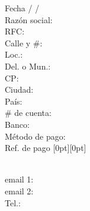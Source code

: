 \documentclass{article}
\newlength{\xorig}   \setlength{\xorig}{0cm}
\newlength{\yorig}   \setlength{\yorig}{0cm}
\begin{document}
\begin{center}
\begin{minipage}{0.4675\textwidth}
	\end{minipage} \hspace{0.5cm}
	\begin{minipage}{0.4675\textwidth}
		Fecha \sout{\hfill\mbox{}} \hspace{1.25cm} / \hspace{1.25cm} / \hspace{1.25cm} \\
		Razón social: \uline{\hfill\mbox{}} \\
		RFC: \uline{\hfill\mbox{}} \\
		Calle y \#: \uline{\hfill\mbox{}} \\
		Loc.: \uline{\hfill\mbox{}} \\
		Del. o Mun.: \uline{\hfill\mbox{}} \\
		CP: \uline{\hfill\mbox{}} \\
		Ciudad: \uline{\hfill\mbox{}} \\
		País: \uline{\hfill\mbox{}} \\
		\# de cuenta: \uline{\hfill\mbox{}} \\
		Banco: \uline{\hfill\mbox{}} \\
		Método de pago: \uline{\hfill\mbox{}} \\
		Ref. de pago \sout{\hfill{}\mbox{}} \raisebox{-0.6em}[0pt][0pt]{
		}\\
		email 1: \uline{\hfill{}\mbox{}} \\
		email 2: \uline{\hfill{}\mbox{}} \\
		Tel.: \uline{\hfill{}\mbox{}}
	\end{minipage}
\end{center}
\end{document}
